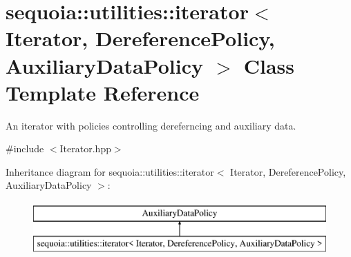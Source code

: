 \hypertarget{classsequoia_1_1utilities_1_1iterator}{}\section{sequoia\+::utilities\+::iterator$<$ Iterator, Dereference\+Policy, Auxiliary\+Data\+Policy $>$ Class Template Reference}
\label{classsequoia_1_1utilities_1_1iterator}


An iterator with policies controlling dereferncing and auxiliary data.  




{\ttfamily \#include $<$Iterator.\+hpp$>$}

Inheritance diagram for sequoia\+::utilities\+::iterator$<$ Iterator, Dereference\+Policy, Auxiliary\+Data\+Policy $>$\+:\begin{figure}[H]
\begin{center}
\leavevmode
\includegraphics[height=2.000000cm]{classsequoia_1_1utilities_1_1iterator}
\end{center}
\end{figure}
